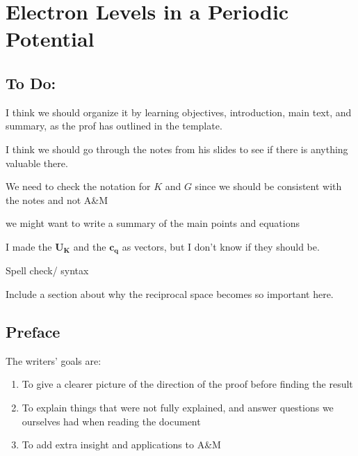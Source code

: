 \chapter{Electron Levels in a Periodic Potential}

\listoftodos

\section{To Do:}
	I think we should organize it by learning objectives, introduction, main text, and summary, as the prof has outlined in the template.

	I think we should go through the notes from his slides to see if there is anything valuable there.

	We need to check the notation for $K$ and $G$ since we should be consistent with the notes and not A\&M

	we might want to write a summary of the main points and equations

	I made the $\mathbf{U_K}$ and the $\mathbf{c_q}$ as vectors, but I don't know if they should be.

	Spell check/ syntax

	Include a section about why the reciprocal space becomes so important here.

\section{Preface}

	The writers' goals are:
	\begin{enumerate}
		\item To give a clearer picture of the direction of the proof before finding the result
		\item To explain things that were not fully explained, and answer questions we ourselves had when reading the document
		\item To add extra insight and applications to A\&M
	\end{enumerate}


